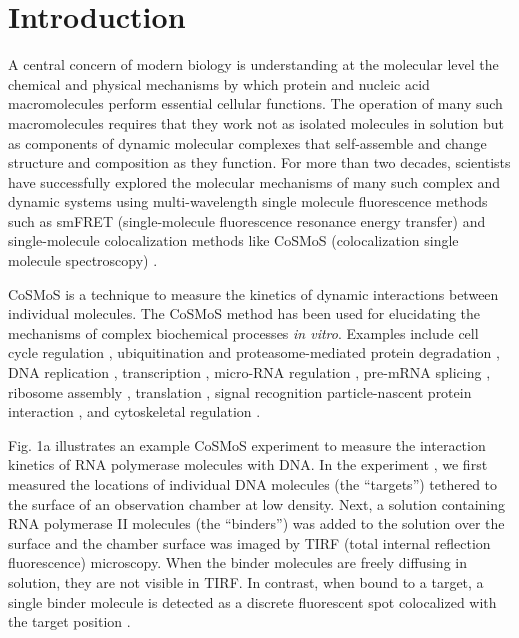 \section*{Introduction}


A central concern of modern biology is understanding at the molecular level the chemical and physical mechanisms by which protein and nucleic acid macromolecules  perform essential cellular functions.  The operation of many such macromolecules requires that they work not as isolated molecules in solution but as components of dynamic molecular complexes that self-assemble and change structure and composition as they function.  For more than  two decades, scientists have successfully explored the molecular mechanisms of many such complex and dynamic systems using multi-wavelength single molecule fluorescence methods such as smFRET (single-molecule fluorescence resonance energy transfer) \cite{Roy2008-fo} and single-molecule colocalization methods like CoSMoS (colocalization single molecule spectroscopy) \cite{Larson2014-os, Van_Oijen2011-ig}.

CoSMoS is a technique to measure the kinetics of dynamic interactions between individual molecules.  The CoSMoS method has been used for elucidating the mechanisms of complex biochemical processes \textit{in vitro}. Examples include cell cycle regulation \cite{Lu2015-eu}, ubiquitination and proteasome-mediated protein degradation \cite{Lu2015-jq}, DNA replication \cite{Geertsema2014-bt,Ticau2015-ib}, transcription \cite{Zhang2012-no,Friedman2012-if,Friedman2013-sf}, micro-RNA regulation \cite{Salomon2015-kq}, pre-mRNA splicing \cite{Shcherbakova2013-bi, Krishnan2013-fy, Warnasooriya2014-ls}, ribosome assembly \cite{Kim2014-zc}, translation \cite{Wang2015-tt,Tsai2014-mi,OLeary2013-wo}, signal recognition particle-nascent protein interaction \cite{Noriega2014-vj}, and cytoskeletal regulation \cite{Smith2013-qj,Breitsprecher2012-mj}. 

Fig. 1a illustrates an example CoSMoS experiment to measure the interaction kinetics of RNA polymerase molecules with DNA. In the experiment \cite{Rosen2020-zn}, we first measured the locations of individual DNA molecules (the ``targets'') tethered to the surface of an observation chamber at low density. Next, a solution containing RNA polymerase II molecules (the ``binders'') was added to the solution over the surface and the chamber surface was imaged by TIRF (total internal reflection fluorescence) microscopy. When the binder molecules are freely diffusing in solution, they are not visible in TIRF. In contrast, when bound to a target, a single binder molecule is detected as a discrete fluorescent spot colocalized with the target position \cite{Friedman2006-kb, Friedman2015-nx}.

